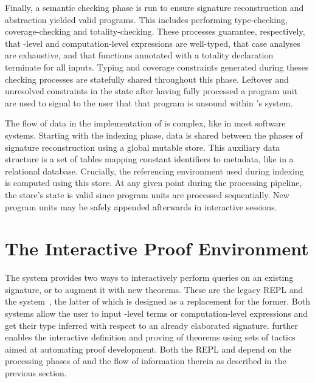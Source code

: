 Finally, a semantic checking phase is run to ensure signature reconstruction and abstraction yielded valid programs.
This includes performing type-checking, coverage-checking and totality-checking.
These processes guarantee, respectively, that \LF-level and computation-level expressions are well-typed, that case analyses are exhaustive, and that functions annotated with a totality declaration terminate for all inputs.
Typing and coverage constraints generated during theses checking processes are statefully shared throughout this phase.
Leftover and unresolved constraints in the state after having fully processed a program unit are used to signal to the user that that program is unsound within \Beluga's system.

The flow of data in the implementation of \Beluga is complex, like in most software systems.
Starting with the indexing phase, data is shared between the phases of signature reconstruction using a global mutable store.
This auxiliary data structure is a set of tables mapping constant identifiers to metadata, like in a relational database.
Crucially, the referencing environment used during indexing is computed using this store.
At any given point during the processing pipeline, the store's state is valid since program units are processed sequentially.
New program units may be safely appended afterwards in interactive sessions.

\section{The \Harpoon Interactive Proof Environment}\label{section:harpoon-background}

The \Beluga system provides two ways to interactively perform queries on an existing \Beluga signature, or to augment it with new theorems.
These are the legacy \ac{REPL} and the \Harpoon system~\cite{errington2021harpoon}, the latter of which is designed as a replacement for the former.
Both systems allow the user to input \LF-level terms or computation-level expressions and get their type inferred with respect to an already elaborated \Beluga signature.
\Harpoon further enables the interactive definition and proving of theorems using sets of tactics aimed at automating proof development.
Both the \ac{REPL} and \Harpoon depend on the processing phases of \Beluga and the flow of information therein as described in the previous section.


